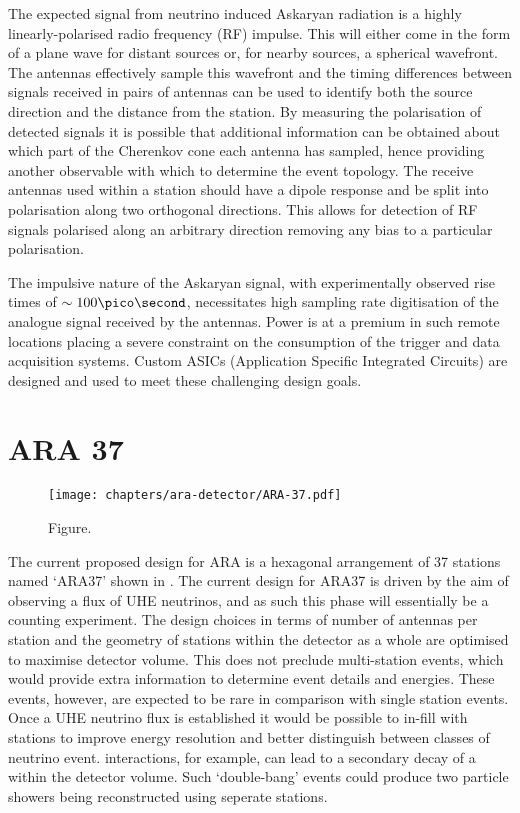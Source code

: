 The expected signal from neutrino induced Askaryan radiation is a highly linearly-polarised radio frequency (RF) impulse. This will either come in the form of a plane wave for distant sources or, for nearby sources, a spherical wavefront. The antennas effectively sample this wavefront and the timing differences between signals received in pairs of antennas can be used to identify both the source direction and the distance from the station. By measuring the polarisation of detected signals it is possible that additional information can be obtained about which part of the Cherenkov cone each antenna has sampled, hence providing another observable with which to determine the event topology. The receive antennas used within a station should have a dipole response and be split into polarisation along two orthogonal directions. This allows for detection of RF signals polarised along an arbitrary direction removing any bias to a particular polarisation.

The impulsive nature of the Askaryan signal, with experimentally observed rise times of $\sim 100 \pico \second$, necessitates high sampling rate digitisation of the analogue signal received by the antennas. Power is at a premium in such remote locations placing a severe constraint on the consumption of the trigger and data acquisition systems. Custom ASICs (Application Specific Integrated Circuits) are designed and used to meet these challenging design goals.



\section{ARA 37}
\label{sec:ara-detector:ARA37}

\begin{figure}[htpb]
  \centering
  \texttt{[image: chapters/ara-detector/ARA-37.pdf]}
  \caption{Figure.}
  \label{fig:ara-detector:ARA-37:ARA-37}
\end{figure}

The current proposed design for ARA is a hexagonal arrangement of 37 stations named `ARA37' shown in . The current design for ARA37 is driven by the aim of observing a flux of UHE neutrinos, and as such this phase will essentially be a counting experiment. The design choices in terms of number of antennas per station and the geometry of stations within the detector as a whole are optimised to maximise detector volume. This does not preclude multi-station events, which would provide extra information to determine event details and energies. These events, however, are expected to be rare in comparison with single station events. Once a UHE neutrino flux is established it would be possible to in-fill with stations to improve energy resolution and better distinguish between classes of neutrino event. \Pnut interactions, for example, can lead to a secondary decay of a \Ptau within the detector volume. Such `double-bang' events could produce two particle showers being reconstructed using seperate stations.


